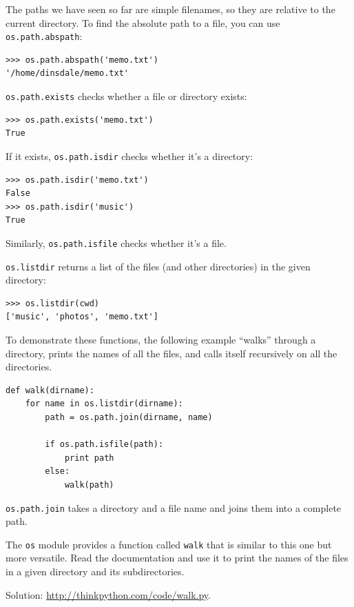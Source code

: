 \documentclass[10pt]{book}
\begin{document}
The paths we have seen so far are simple filenames, so they are
relative to the current directory.  To find the absolute path to
a file, you can use {\tt os.path.abspath}:

\begin{verbatim}
>>> os.path.abspath('memo.txt')
'/home/dinsdale/memo.txt'
\end{verbatim}
%
{\tt os.path.exists} checks
whether a file or directory exists:

\begin{verbatim}
>>> os.path.exists('memo.txt')
True
\end{verbatim}
%
If it exists, {\tt os.path.isdir} checks whether it's a directory:

\begin{verbatim}
>>> os.path.isdir('memo.txt')
False
>>> os.path.isdir('music')
True
\end{verbatim}
%
Similarly, {\tt os.path.isfile} checks whether it's a file.

{\tt os.listdir} returns a list of the files (and other directories)
in the given directory:

\begin{verbatim}
>>> os.listdir(cwd)
['music', 'photos', 'memo.txt']
\end{verbatim}
%
To demonstrate these functions, the following example
``walks'' through a directory, prints
the names of all the files, and calls itself recursively on
all the directories.

\begin{verbatim}
def walk(dirname):
    for name in os.listdir(dirname):
        path = os.path.join(dirname, name)

        if os.path.isfile(path):
            print path
        else:
            walk(path)
\end{verbatim}
%
{\tt os.path.join} takes a directory and a file name and joins
them into a complete path.  

\begin{exercise}

The {\tt os} module provides a function called {\tt walk}
that is similar to this one but more versatile.  Read
the documentation and use it to print the names of the
files in a given directory and its subdirectories.

Solution: \url{http://thinkpython.com/code/walk.py}.

\end{exercise}
\end{document}
